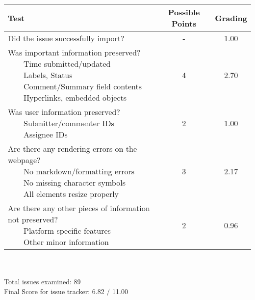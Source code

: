 \documentclass{article}
\newcommand{\tabitem}{~~\llap{\textbullet}~~}
\begin{document}
\begin{adjustbox}{center}
	\renewcommand{\arraystretch}{1.5}
	\begin{tabular}{ p{6cm} | c | c }
		Test & Possible Points & Grading \\ \hline
		Did the issue successfully import? & - & 1.00 \\
		\hline
		\makecell[l]{
			Was important information preserved? \\
			\tabitem Time submitted/updated \\
			\tabitem Labels, Status \\
			\tabitem Comment/Summary field contents \\
			\tabitem Hyperlinks, embedded objects}
		& 4 & 2.70 \\
		\hline
		\makecell[l]{
			Was user information preserved? \\
			\tabitem Submitter/commenter IDs \\
			\tabitem Assignee IDs
		} & 2 & 1.00 \\
		\hline
		\makecell[{{p{6cm}}}]{
			Are there any rendering errors on the webpage? \\
			\tabitem No markdown/formatting errors \\
			\tabitem No missing character symbols \\
			\tabitem All elements resize properly
		} & 3 & 2.17 \\
		\hline
		\makecell[{{p{6cm}}}]{
			Are there any other pieces of information not preserved? \\
			\tabitem Platform specific features \\
			\tabitem Other minor information
		} & 2 & 0.96 \\
	\end{tabular}
\end{adjustbox}
\\
\\Total issues examined: 89\\Final Score for issue tracker: 6.82 / 11.00 \\ \\\begin{adjustbox}{center}
\end{adjustbox}
\end{document}
